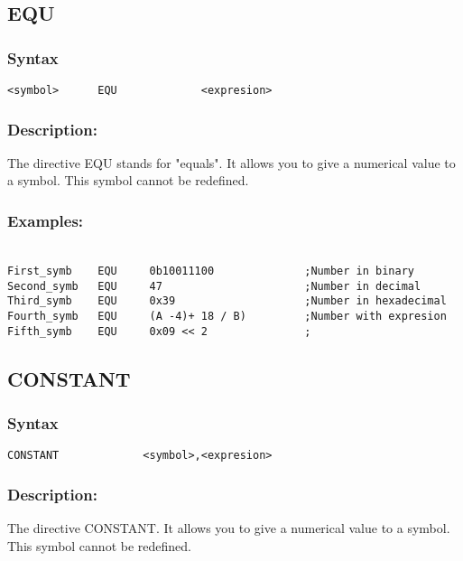     \subsection{EQU}
        \subsubsection{Syntax}
            \verb'<symbol>      EQU             <expresion> '
            
        \subsubsection{Description:}
                The directive EQU stands for "equals". It allows you to give a numerical value to a symbol. This symbol cannot be redefined.
                
        \subsubsection{Examples:}
       {
            ~\\
            \usecodefont
            \verb'First_symb    EQU     0b10011100              ;Number in binary'\\
            \verb'Second_symb   EQU     47                      ;Number in decimal'\\
            \verb'Third_symb    EQU     0x39                    ;Number in hexadecimal'\\
            \verb'Fourth_symb   EQU     (A -4)+ 18 / B)         ;Number with expresion'\\
            \verb'Fifth_symb    EQU     0x09 << 2               ;'\\
        }

    \subsection{CONSTANT}
        \subsubsection{Syntax}
            \verb'CONSTANT             <symbol>,<expresion> '

        \subsubsection{Description:}
                The directive CONSTANT. It allows you to give a numerical value to a symbol. This symbol cannot be redefined.

